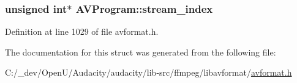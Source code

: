 \subsubsection[{\texorpdfstring{stream\+\_\+index}{stream_index}}]{\setlength{\rightskip}{0pt plus 5cm}unsigned {\bf int}$\ast$ A\+V\+Program\+::stream\+\_\+index}\hypertarget{struct_a_v_program_a7967d41af4812ed61a28762e988c7a02}{}\label{struct_a_v_program_a7967d41af4812ed61a28762e988c7a02}


Definition at line 1029 of file avformat.\+h.



The documentation for this struct was generated from the following file\+:\begin{DoxyCompactItemize}
\item 
C\+:/\+\_\+dev/\+Open\+U/\+Audacity/audacity/lib-\/src/ffmpeg/libavformat/\hyperlink{avformat_8h}{avformat.\+h}\end{DoxyCompactItemize}
